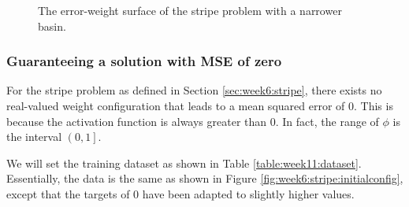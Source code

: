 \documentclass{article}
\begin{document}
\begin{figure}[h]
    \centering
    \caption{The error-weight surface of the stripe problem with a narrower basin.}
    \label{fig:week11:stripe:errorsurface:thin}
\end{figure}

\subsubsection{Guaranteeing a solution with MSE of zero}

For the stripe problem as defined in Section \ref{sec:week6:stripe}, there exists no real-valued weight configuration that leads to a mean squared error of 0. 
This is because the activation function is always greater than 0. In fact, the range of $\phi$ is the interval $\left(0, 1\right]$.

We will set the training dataset as shown in Table \ref{table:week11:dataset}. 
Essentially, the data is the same as shown in Figure \ref{fig:week6:stripe:initialconfig}, except that the targets of $0$ have been adapted to slightly higher values.
\end{document}
